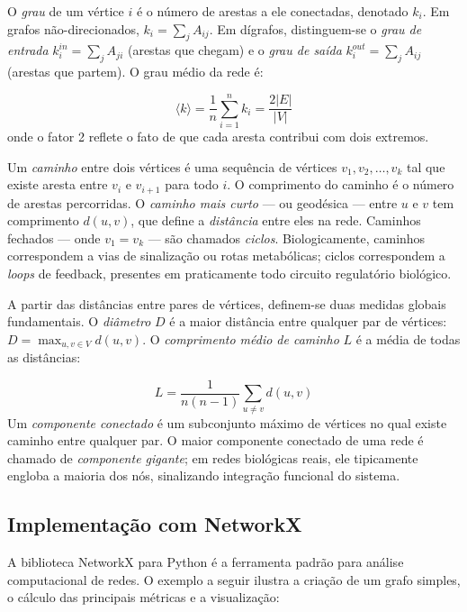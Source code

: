 O \emph{grau} de um vértice $i$ é o número de arestas a ele conectadas, denotado $k_i$.
Em grafos não-direcionados, $k_i = \sum_j A_{ij}$. Em dígrafos, distinguem-se o
\emph{grau de entrada} $k_i^{in} = \sum_j A_{ji}$ (arestas que chegam) e o
\emph{grau de saída} $k_i^{out} = \sum_j A_{ij}$ (arestas que partem). O grau médio
da rede é:

\begin{equation}
\langle k \rangle = \frac{1}{n} \sum_{i=1}^{n} k_i = \frac{2|E|}{|V|}
\end{equation}
onde o fator 2 reflete o fato de que cada aresta contribui com dois extremos.

Um \emph{caminho} entre dois vértices é uma sequência de vértices $v_1, v_2, \ldots, v_k$
tal que existe aresta entre $v_i$ e $v_{i+1}$ para todo $i$. O comprimento do caminho é o
número de arestas percorridas. O \emph{caminho mais curto} --- ou geodésica --- entre $u$ e $v$
tem comprimento $d(u,v)$, que define a \emph{distância} entre eles na rede. Caminhos fechados
--- onde $v_1 = v_k$ --- são chamados \emph{ciclos}. Biologicamente, caminhos correspondem a
vias de sinalização ou rotas metabólicas; ciclos correspondem a \emph{loops} de feedback,
presentes em praticamente todo circuito regulatório biológico.

A partir das distâncias entre pares de vértices, definem-se duas medidas globais
fundamentais. O \emph{diâmetro} $D$ é a maior distância entre qualquer par de vértices:
$D = \max_{u,v \in V} d(u,v)$. O \emph{comprimento médio de caminho} $L$ é a média de
todas as distâncias:

\begin{equation}
L = \frac{1}{n(n-1)} \sum_{u \neq v} d(u, v)
\end{equation}
Um \emph{componente conectado} é um subconjunto máximo de vértices no qual existe caminho
entre qualquer par. O maior componente conectado de uma rede é chamado de
\emph{componente gigante}; em redes biológicas reais, ele tipicamente engloba a maioria dos
nós, sinalizando integração funcional do sistema.


\subsection{Implementação com NetworkX}

A biblioteca NetworkX para Python é a ferramenta padrão para análise computacional de
redes. O exemplo a seguir ilustra a criação de um grafo simples, o cálculo das principais
métricas e a visualização:

